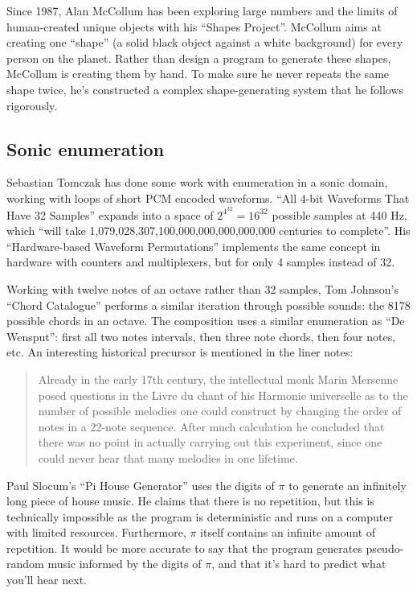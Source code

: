 \documentclass{thesis}
\begin{document}
	Since 1987, Alan McCollum has been exploring large numbers and the limits of human-created unique objects with his ``Shapes Project''.\cite{allan_mccollum_shapes_2006} McCollum aims at creating one ``shape'' (a solid black object against a white background) for every person on the planet. Rather than design a program to generate these shapes, McCollum is creating them by hand. To make sure he never repeats the same shape twice, he's constructed a complex shape-generating system that he follows rigorously. 

\subsection{Sonic enumeration}

	Sebastian Tomczak has done some work with enumeration in a sonic domain, working with loops of short PCM encoded waveforms. ``All 4-bit Waveforms That Have 32 Samples''\cite{tomczak_all_2009} expands into a space of $2^{4^{32}}=16^{32}$ possible samples at 440 Hz, which ``will take 1,079,028,307,100,000,000,000,000,000 centuries to complete''. His ``Hardware-based Waveform Permutations''\cite{tomczak_hardware-based_2009} implements the same concept in hardware with counters and multiplexers, but for only 4 samples instead of 32.
	
	Working with twelve notes of an octave rather than 32 samples, Tom Johnson's ``Chord Catalogue''\cite{tom_johnson_liner_1999} performs a similar iteration through possible sounds: the 8178 possible chords in an octave. The composition uses a similar enumeration as ``De Wensput'': first all two notes intervals, then three note chords, then four notes, etc. An interesting historical precursor is mentioned in the liner notes:
	
	\begin{quote}
	Already in the early 17th century, the intellectual monk Marin Mersenne posed questions in the Livre du chant of his Harmonie universelle as to the number of possible melodies one could construct by changing the order of notes in a 22-note sequence. After much calculation he concluded that there was no point in actually carrying out this experiment, since one could never hear that many melodies in one lifetime.
	\end{quote}
		
	Paul Slocum's ``Pi House Generator''\cite{paul_slocum_pi_2007} uses the digits of $\pi$ to generate an infinitely long piece of house music. He claims that there is no repetition, but this is technically impossible as the program is deterministic and runs on a computer with limited resources. Furthermore, $\pi$ itself contains an infinite amount of repetition. It would be more accurate to say that the program generates pseudo-random music informed by the digits of $\pi$, and that it's hard to predict what you'll hear next.
	
\end{document}

